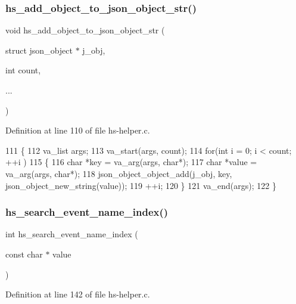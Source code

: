 \subsubsection{\texorpdfstring{hs\+\_\+add\+\_\+object\+\_\+to\+\_\+json\+\_\+object\+\_\+str()}{hs\_add\_object\_to\_json\_object\_str()}}
{\footnotesize\ttfamily void hs\+\_\+add\+\_\+object\+\_\+to\+\_\+json\+\_\+object\+\_\+str (\begin{DoxyParamCaption}\item[{struct json\+\_\+object $\ast$}]{j\+\_\+obj,  }\item[{int}]{count,  }\item[{}]{... }\end{DoxyParamCaption})}



Definition at line 110 of file hs-\/helper.\+c.


\begin{DoxyCode}
111 \{
112     va\_list args;
113     va\_start(args, count);
114     \textcolor{keywordflow}{for}(\textcolor{keywordtype}{int} i = 0; i < count; ++i )
115     \{
116         \textcolor{keywordtype}{char} *key = va\_arg(args, \textcolor{keywordtype}{char}*);
117         \textcolor{keywordtype}{char} *value = va\_arg(args, \textcolor{keywordtype}{char}*);
118         json\_object\_object\_add(j\_obj, key, json\_object\_new\_string(value));
119         ++i;
120     \}
121     va\_end(args);
122 \}
\end{DoxyCode}
\mbox{\label{hs-helper_8c_a2ff1b894941c3b461ca8119079c4146a}} 
\subsubsection{\texorpdfstring{hs\+\_\+search\+\_\+event\+\_\+name\+\_\+index()}{hs\_search\_event\_name\_index()}}
{\footnotesize\ttfamily int hs\+\_\+search\+\_\+event\+\_\+name\+\_\+index (\begin{DoxyParamCaption}\item[{const char $\ast$}]{value }\end{DoxyParamCaption})}



Definition at line 142 of file hs-\/helper.\+c.


